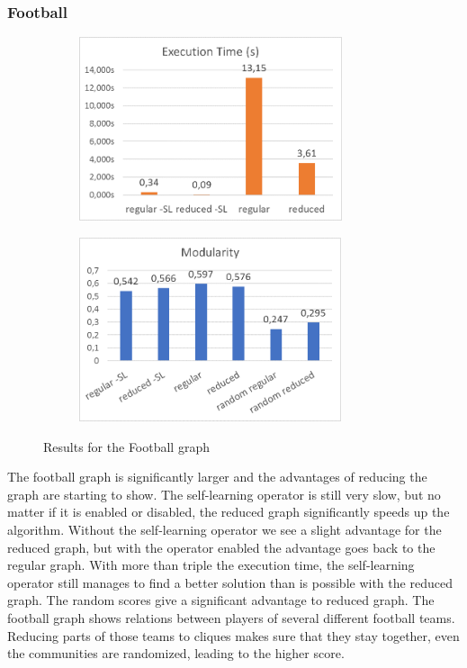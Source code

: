 \subsubsection{Football}
\begin{figure}[H]
\begin{center}
    \begin{subfigure}{0.47\textwidth}
    \begin{center}
    \includegraphics[height=5.4cm]{images/footballtime.png}
    \end{center}
    \end{subfigure}
    \begin{subfigure}{0.47\textwidth}
    \begin{center}
    \includegraphics[height=5.4cm]{images/footballfitness.png}
    \end{center}
    \end{subfigure}
\caption{Results for the Football graph}\label{fig:football}
\end{center}
\end{figure}
The football graph is significantly larger and the advantages of reducing the graph are starting to show. The self-learning operator is still very slow, but no matter if it is enabled or disabled, the reduced graph significantly speeds up the algorithm. Without the self-learning operator we see a slight advantage for the reduced graph, but with the operator enabled the advantage goes back to the regular graph. With more than triple the execution time, the self-learning operator still manages to find a better solution than is possible with the reduced graph. The random scores give a significant advantage to reduced graph. The football graph shows relations between players of several different football teams. Reducing parts of those teams to cliques makes sure that they stay together, even the communities are randomized, leading to the higher score.

